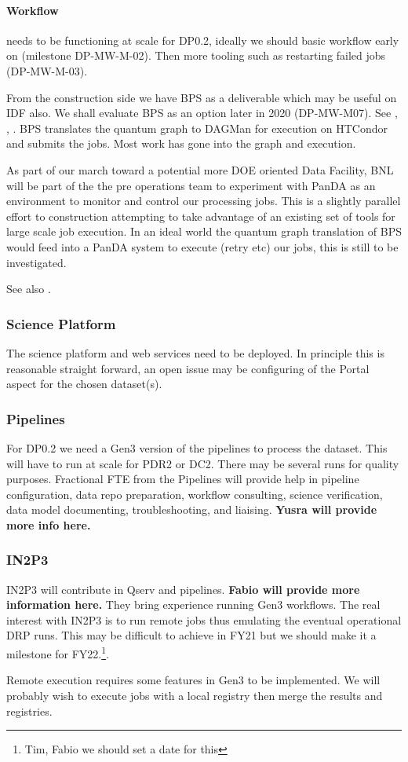 \paragraph{Workflow} needs to be functioning at scale for DP0.2, ideally we should basic workflow
early on (milestone DP-MW-M-02). Then more tooling such as restarting failed jobs (DP-MW-M-03).

From the construction side we have BPS as a deliverable which may be useful on IDF also.
We shall evaluate BPS as an option later in 2020 (DP-MW-M07).
See , , .
BPS translates the quantum graph to DAGMan for execution on HTCondor and submits the jobs.
Most work has gone into the graph and execution.

As part of our march toward a potential more DOE oriented Data Facility, BNL will be part of the the pre operations team to experiment with PanDA as an environment to monitor and control our processing jobs.
This is a slightly parallel effort to construction attempting to take advantage of an existing set of tools for large scale job execution.
In an ideal world the quantum graph translation of BPS would feed into a PanDA system to execute (retry etc) our jobs, this is still to be investigated.

See also .




\subsubsection{ Science Platform}
The science platform and web services need to be deployed. In principle this is reasonable straight forward, an open issue may be configuring of the Portal aspect for the chosen  dataset(s).

\subsubsection{ Pipelines }
For DP0.2 we need a Gen3 version of the pipelines to process the dataset. This will have to run at scale for PDR2 or DC2. There may be several runs for quality purposes.
Fractional FTE from the Pipelines will provide help in pipeline configuration, data repo preparation, workflow consulting, science verification, data model documenting, troubleshooting, and liaising.
{\bf Yusra will provide more info here.}

\subsubsection{ IN2P3}\label{sec:in2p3}
IN2P3 will contribute in Qserv and pipelines. {\bf Fabio will provide more information here.}
They bring experience running Gen3 workflows. The real interest with IN2P3 is to run remote jobs thus emulating the eventual operational DRP runs. This may be difficult to achieve in FY21 but we should make it a milestone for FY22.\footnote{Tim, Fabio we should set a date for this}.

Remote execution requires some  features in Gen3 to be implemented. We will probably wish to execute jobs with a local registry then merge the results and registries.
